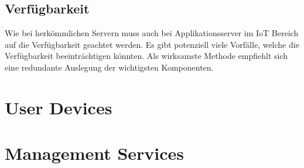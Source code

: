 \subsection{Verfügbarkeit}
Wie bei herkömmlichen Servern muss auch bei Applikationsserver im IoT Bereich auf die Verfügbarkeit geachtet werden. Es gibt potenziell viele Vorfälle, welche die Verfügbarkeit beeinträchtigen könnten. Als wirksamste Methode empfiehlt sich eine redundante Auslegung der wichtigsten Komponenten.

\section{User Devices}

\section{Management Services}




